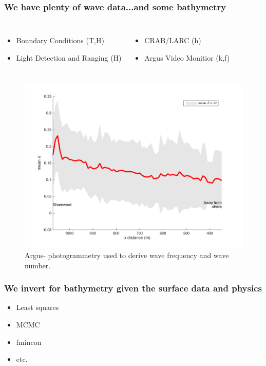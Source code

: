 \documentclass[7pt]{beamer}
\begin{document}
\begin{frame}
\frametitle{We have plenty of wave data...and some bathymetry}
\begin{columns}
\begin{itemize}
\item Boundary Conditions (T,H)
\item Light Detection and Ranging (H)
\end{itemize}
\begin{itemize}
\item CRAB/LARC (h)
\item Argus Video Monitior (k,f)
\end{itemize}
\end{columns}

\begin{figure}[H]
\centering
\includegraphics[width=.45\linewidth]{img/k1Dmean_std.png}
\captionsetup{labelformat=empty}
\caption{Argus- photogrammetry used to derive wave frequency and wave number.}

\end{figure}
\end{frame}


\begin{frame}
 \frametitle{We invert for bathymetry given the surface data and physics}

\begin{itemize}
\item Least squares
\item MCMC
\item fmincon
\item etc.
\end{itemize}


\end{frame}
\end{document}
